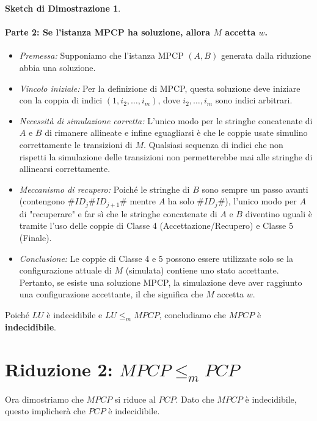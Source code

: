 \documentclass[a4paper]{article}
\theoremstyle{definition} %
\newtheorem{proof_sketch}{Sketch di Dimostrazione} %
\theoremstyle{remark} %
\begin{document}
\begin{proof_sketch}
\paragraph{Parte 2: Se l'istanza MPCP ha soluzione, allora $M$ accetta $w$.}

\begin{itemize}
    \item \emph{Premessa:} Supponiamo che l'istanza MPCP $(A, B)$ generata dalla riduzione abbia una soluzione.
    
    \item \emph{Vincolo iniziale:} Per la definizione di MPCP, questa soluzione deve iniziare con la coppia di indici $(1, i_2, \dots, i_m)$, dove $i_2, \dots, i_m$ sono indici arbitrari.
    
    \item \emph{Necessità di simulazione corretta:} L'unico modo per le stringhe concatenate di $A$ e $B$ di rimanere allineate e infine eguagliarsi è che le coppie usate simulino correttamente le transizioni di $M$. Qualsiasi sequenza di indici che non rispetti la simulazione delle transizioni non permetterebbe mai alle stringhe di allinearsi correttamente.
    
    \item \emph{Meccanismo di recupero:} Poiché le stringhe di $B$ sono sempre un passo avanti (contengono $\#ID_j\#ID_{j+1}\#$ mentre $A$ ha solo $\#ID_j\#$), l'unico modo per $A$ di "recuperare" e far sì che le stringhe concatenate di $A$ e $B$ diventino uguali è tramite l'uso delle coppie di Classe 4 (Accettazione/Recupero) e Classe 5 (Finale).
    
    \item \emph{Conclusione:} Le coppie di Classe 4 e 5 possono essere utilizzate solo se la configurazione attuale di $M$ (simulata) contiene uno stato accettante. Pertanto, se esiste una soluzione MPCP, la simulazione deve aver raggiunto una configurazione accettante, il che significa che $M$ accetta $w$.
\end{itemize}
\end{proof_sketch}

Poiché $LU$ è indecidibile e $LU \le_m MPCP$, concludiamo che $MPCP$ è \textbf{indecidibile}.

\section{Riduzione 2: $MPCP \le_m PCP$}

Ora dimostriamo che $MPCP$ si riduce al $PCP$. Dato che $MPCP$ è indecidibile, questo implicherà che $PCP$ è indecidibile.
\end{document}
